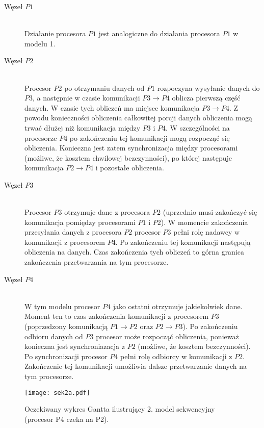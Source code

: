 \begin{description}

\item[Węzeł $P1$] \hfill \\

Działanie procesora $P1$ jest analogiczne do działania procesora $P1$ w modelu 1.

\item[Węzeł $P2$] \hfill \\

Procesor $P2$ po otrzymaniu danych od $P1$ rozpoczyna wysyłanie danych do $P3$, a następnie w czasie komunikacji $P3 \to P4$ oblicza pierwszą część danych.
W czasie tych obliczeń ma miejsce komunikacja $P3 \to P4$. Z powodu konieczności obliczenia całkowitej porcji danych obliczenia mogą trwać dłużej niż komunikacja
między $P3$ i $P4$. W szczególności na procesorze $P4$ po zakończeniu tej komunikacji mogą rozpocząć się obliczenia.
Konieczna jest zatem synchronizacja między procesorami (możliwe, że kosztem chwilowej bezczynności), po której następuje komunikacja $P2 \to P4$ i pozostałe obliczenia.

\item[Węzeł $P3$] \hfill \\

Procesor $P3$ otrzymuje dane z procesora $P2$ (uprzednio musi zakończyć się komunikacja pomiędzy procesorami $P1$ i $P2$).
W momencie zakończenia przesyłania danych z procesora $P2$ procesor $P3$ pełni rolę nadawcy w komunikacji z procesorem $P4$.
Po zakończeniu tej komunikacji następują obliczenia na danych. Czas zakończenia tych obliczeń to górna granica zakończenia przetwarzania na tym procesorze.

\item[Węzeł $P4$] \hfill \\

W tym modelu procesor $P4$ jako ostatni otrzymuje jakiekolwiek dane. Moment ten to czas zakończenia komunikacji z procesorem $P3$ (poprzedzony komunikacją $P1 \to P2$ oraz $P2 \to P3$). Po zakończeniu odbioru danych od $P3$ procesor może rozpocząć obliczenia, ponieważ konieczna jest synchroniazacja z $P2$ (możliwe, że kosztem bezczynności). Po synchronizacji procesor $P4$ pełni rolę odbiorcy w komunikacji z $P2$. Zakończenie tej komunikacji umożliwia dalsze przetwarzanie danych na tym procesorze. 

\end{description}

\begin{figure}[!ht]
\centering
\texttt{[image: sek2a.pdf]}
\caption{Oczekiwany wykres Gantta ilustrujący 2. model sekwencyjny (procesor P4 czeka na P2).}
\label{fig:seq2a}
\end{figure}

